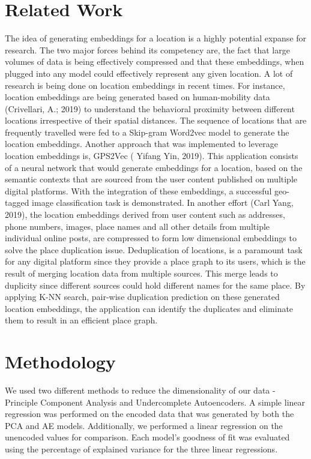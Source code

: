 \documentclass{article}
\begin{document}
\section{Related Work}
The idea of generating embeddings for a location is a highly potential expanse for research.
The two major forces behind its competency are, the fact that large volumes of data is being
effectively compressed and that these embeddings, when plugged into any model could effectively
represent any given location.  A lot of research is being done on location embeddings in recent
times. For instance, location embeddings are being generated based on human-mobility data 
(Crivellari, A.; 2019) to understand the behavioral proximity between different locations 
irrespective of their spatial distances. The sequence of locations that are frequently
travelled were fed to a Skip-gram Word2vec model to generate the location embeddings. Another 
approach that was implemented to leverage location embeddings is, GPS2Vec ( Yifang Yin, 2019).
This application consists of a neural network that would generate embeddings for a location, 
based on the semantic contexts that are sourced from the user content published on multiple 
digital platforms. With the integration of these embeddings, a successful geo-tagged image
classification task is demonstrated. In another effort (Carl Yang, 2019), the location 
embeddings derived from user content such as addresses, phone numbers, images, place names and 
all other details from multiple individual online posts, are compressed to form low dimensional
embeddings to solve the place duplication issue. Deduplication of locations, is a paramount 
task for any digital platform since they provide a place graph to its users, which is the 
result of merging location data from multiple sources. This merge leads to duplicity since 
different sources could hold different names for the same place. By applying K-NN search, 
pair-wise duplication prediction on these generated location embeddings, the application can
identify the duplicates and eliminate them to result in an efficient place graph.

\section{Methodology}

We used two different methods to reduce the dimensionality of our data - Principle Component
Analysis and Undercomplete Autoencoders. A simple linear regression was performed on 
the encoded data that was generated by both the PCA and AE models. Additionally, we performed
a linear regression on the unencoded values for comparison. Each model's goodness of fit
was evaluated using the percentage of explained variance for the three linear regressions. 
\end{document}
